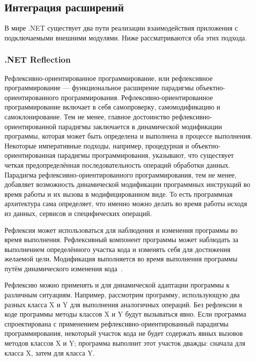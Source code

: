 \subsection{Интеграция расширений}
\label{sec:extention_interaction}

В мире .NET существует два пути реализации взаимодействия приложения с подключаемыми внешними модулями. Ниже рассматриваются оба этих подхода.

\subsubsection{.NET Reflection}

Рефлексивно-ориентированное программирование, или рефлексивное программирование — функциональное расширение парадигмы объектно-ориентированного программирования. Рефлексивно-ориентированное программирование включает в себя самопроверку, самомодификацию и самоклонирование. Тем не менее, главное достоинство рефлексивно-ориентированной парадигмы заключается в динамической модификации программы, которая может быть определена и выполнена в процессе выполнения. Некоторые императивные подходы, например, процедурная и объектно-ориентированная парадигмы программирования, указывают, что существует четкая предопределённая последовательность операций обработки данных. Парадигма рефлексивно-ориентированного программирования, тем не менее, добавляет возможность динамической модификации программных инструкций во время работы и их вызова в модифицированном виде. То есть программная архитектура сама определяет, что именно можно делать во время работы исходя из данных, сервисов и специфических операций.

Рефлексия может использоваться для наблюдения и изменения программы во время выполнения. Рефлексивный компонент программы может наблюдать за выполнением определённого участка кода и изменять себя для достижения желаемой цели. Модификация выполняется во время выполнения программы путём динамического изменения кода~\cite{cs2010-dotnet40}.

Рефлексию можно применять и для динамической адаптации программы к различным ситуациям. Например, рассмотрим программу, использующую два разных класса X и Y для выполнения аналогичных операций. Без рефлексии в коде программы методы классов X и Y будут вызываться явно. Если программа спроектирована с применением рефлексивно-ориентированный парадигмы программирования, некоторый участок кода не будет содержать явных вызовов методов классов X и Y; программа выполнит этот участок дважды: сначала для класса X, затем для класса Y.

